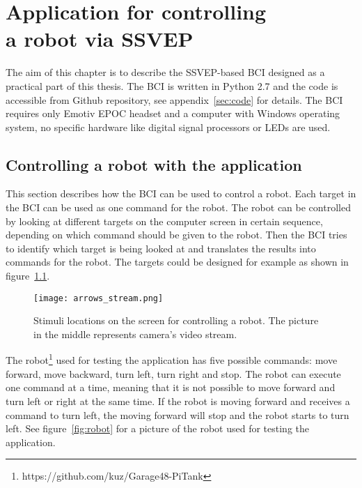 
\chapter[Application for controlling a robot via SSVEP]{Application for controlling\\ a robot via SSVEP}
\label{sec:SSVEP_BCI}

The aim of this chapter is to describe the \gls{SSVEP}-based \gls{BCI} designed as a practical part of this thesis. The \gls{BCI} is written in Python 2.7 and the code is accessible from Github repository, see appendix~\ref{sec:code} for details. The \gls{BCI} requires only Emotiv EPOC headset and a computer with Windows operating system, no specific hardware like digital signal processors or \glspl{LED} are used.

\section{Controlling a robot with the application}

This section describes how the \gls{BCI} can be used to control a robot. Each \gls{target} in the \gls{BCI} can be used as one command for the robot. The robot can be controlled by looking at different \glspl{target} on the computer screen in certain sequence, depending on which command should be given to the robot. Then the \gls{BCI} tries to identify which \gls{target} is being looked at and translates the results into commands for the robot. The \glspl{target} could be designed for example as shown in figure~\ref{fig:arrow_stimuli}.

\begin{figure}[h]
	\centering
	\texttt{[image: arrows\_stream.png]}
	\caption{Stimuli locations on the screen for controlling a robot. The picture in the middle represents camera's video stream.}
	\label{fig:arrow_stimuli}
\end{figure}

The robot\footnote{https://github.com/kuz/Garage48-PiTank} used for testing the application has five possible commands: move forward, move backward, turn left, turn right and stop. The robot can execute one command at a time, meaning that it is not possible to move forward and turn left or right at the same time. If the robot is moving forward and receives a command to turn left, the moving forward will stop and the robot starts to turn left. See figure~\ref{fig:robot} for a picture of the robot used for testing the application.

